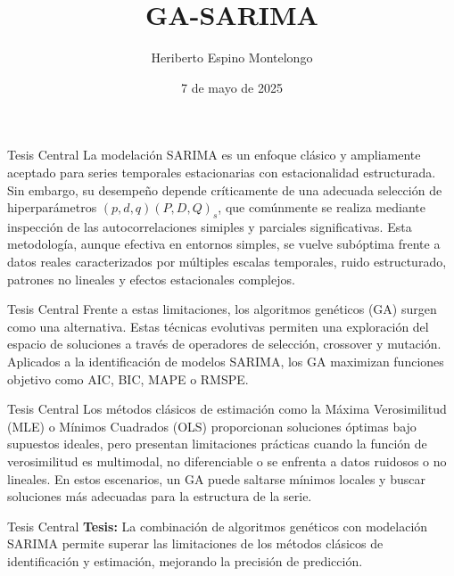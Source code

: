 \documentclass[aspectratio=1610]{beamer}
\title{GA-SARIMA}
\date{7 de mayo de 2025}
\author{Heriberto Espino Montelongo}
\begin{document}
\begin{frame}
\titlepage
\end{frame}




\begin{frame}{Tesis Central}
La modelación SARIMA es un enfoque clásico y ampliamente aceptado para series temporales estacionarias con estacionalidad estructurada. Sin embargo, su desempeño depende críticamente de una adecuada selección de hiperparámetros $(p,d,q)(P,D,Q)_s$, que comúnmente se realiza mediante inspección de las autocorrelaciones simiples y parciales significativas. Esta metodología, aunque efectiva en entornos simples, se vuelve subóptima frente a datos reales caracterizados por múltiples escalas temporales, ruido estructurado, patrones no lineales y efectos estacionales complejos.
\end{frame}

\begin{frame}{Tesis Central}
Frente a estas limitaciones, los algoritmos genéticos (GA) surgen como una alternativa. Estas técnicas evolutivas permiten una exploración del espacio de soluciones a través de operadores de selección, crossover y mutación. Aplicados a la identificación de modelos SARIMA, los GA maximizan funciones objetivo como AIC, BIC, MAPE o RMSPE.
\end{frame}

\begin{frame}{Tesis Central}
Los métodos clásicos de estimación como la Máxima Verosimilitud (MLE) o Mínimos Cuadrados (OLS) proporcionan soluciones óptimas bajo supuestos ideales, pero presentan limitaciones prácticas cuando la función de verosimilitud es multimodal, no diferenciable o se enfrenta a datos ruidosos o no lineales. En estos escenarios, un GA puede saltarse mínimos locales y buscar soluciones más adecuadas para la estructura de la serie.
\end{frame}

\begin{frame}{Tesis Central}
\textbf{Tesis:} La combinación de algoritmos genéticos con modelación SARIMA permite superar las limitaciones de los métodos clásicos de identificación y estimación, mejorando la precisión de predicción.
\end{frame}
\end{document}
